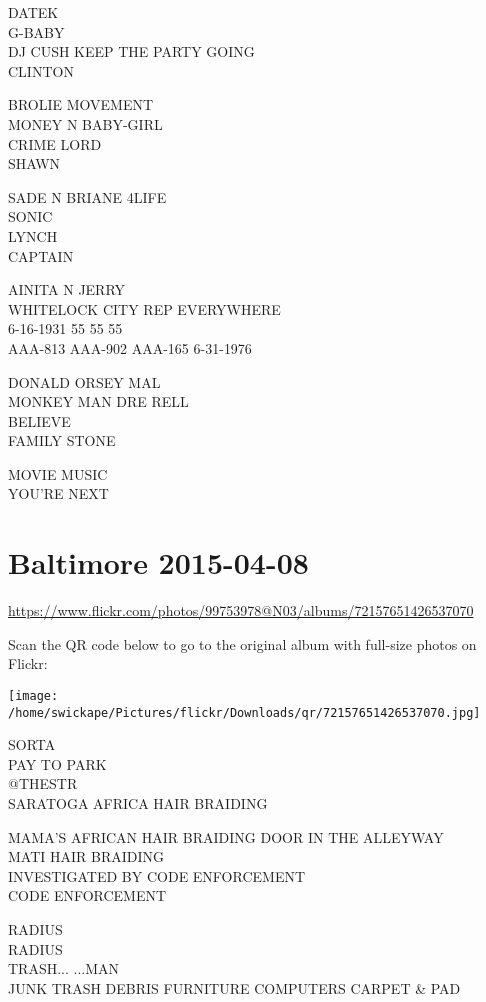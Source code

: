 \documentclass[10pt,letterpaper]{article}
\begin{document}
DATEK\\
G{-}BABY\\
DJ CUSH KEEP THE PARTY GOING\\
CLINTON

BROLIE MOVEMENT\\
MONEY N BABY{-}GIRL\\
CRIME LORD\\
SHAWN

SADE N BRIANE 4LIFE\\
SONIC\\
LYNCH\\
CAPTAIN

AINITA N JERRY\\
WHITELOCK CITY REP EVERYWHERE\\
6{-}16{-}1931 55 55 55\\
AAA{-}813 AAA{-}902 AAA{-}165 6{-}31{-}1976

DONALD ORSEY MAL\\
MONKEY MAN DRE RELL\\
BELIEVE\\
FAMILY STONE

MOVIE MUSIC\\
YOU'RE NEXT


\section*{Baltimore 2015-04-08}

\url{https://www.flickr.com/photos/99753978@N03/albums/72157651426537070}

Scan the QR code below to go to the original album with full-size photos on Flickr:

\texttt{[image: /home/swickape/Pictures/flickr/Downloads/qr/72157651426537070.jpg]}


SORTA\\
PAY TO PARK\\
@THESTR\\
SARATOGA AFRICA HAIR BRAIDING

MAMA'S AFRICAN HAIR BRAIDING DOOR IN THE ALLEYWAY\\
MATI HAIR BRAIDING\\
INVESTIGATED BY CODE ENFORCEMENT\\
CODE ENFORCEMENT

RADIUS\\
RADIUS\\
TRASH... ...MAN\\
JUNK TRASH DEBRIS FURNITURE COMPUTERS CARPET \& PAD
\end{document}
